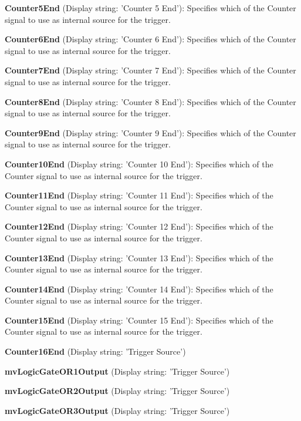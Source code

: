 \begin{DoxyItemize}
\item {\bfseries Counter5\+End} (Display string\+: 'Counter 5 End')\+: Specifies which of the Counter signal to use as internal source for the trigger.
\item {\bfseries Counter6\+End} (Display string\+: 'Counter 6 End')\+: Specifies which of the Counter signal to use as internal source for the trigger.
\item {\bfseries Counter7\+End} (Display string\+: 'Counter 7 End')\+: Specifies which of the Counter signal to use as internal source for the trigger.
\item {\bfseries Counter8\+End} (Display string\+: 'Counter 8 End')\+: Specifies which of the Counter signal to use as internal source for the trigger.
\item {\bfseries Counter9\+End} (Display string\+: 'Counter 9 End')\+: Specifies which of the Counter signal to use as internal source for the trigger.
\item {\bfseries Counter10\+End} (Display string\+: 'Counter 10 End')\+: Specifies which of the Counter signal to use as internal source for the trigger.
\item {\bfseries Counter11\+End} (Display string\+: 'Counter 11 End')\+: Specifies which of the Counter signal to use as internal source for the trigger.
\item {\bfseries Counter12\+End} (Display string\+: 'Counter 12 End')\+: Specifies which of the Counter signal to use as internal source for the trigger.
\item {\bfseries Counter13\+End} (Display string\+: 'Counter 13 End')\+: Specifies which of the Counter signal to use as internal source for the trigger.
\item {\bfseries Counter14\+End} (Display string\+: 'Counter 14 End')\+: Specifies which of the Counter signal to use as internal source for the trigger.
\item {\bfseries Counter15\+End} (Display string\+: 'Counter 15 End')\+: Specifies which of the Counter signal to use as internal source for the trigger.
\item {\bfseries Counter16\+End} (Display string\+: 'Trigger Source')
\item {\bfseries mv\+Logic\+Gate\+O\+R1\+Output} (Display string\+: 'Trigger Source')
\item {\bfseries mv\+Logic\+Gate\+O\+R2\+Output} (Display string\+: 'Trigger Source')
\item {\bfseries mv\+Logic\+Gate\+O\+R3\+Output} (Display string\+: 'Trigger Source')

\end{DoxyItemize}
